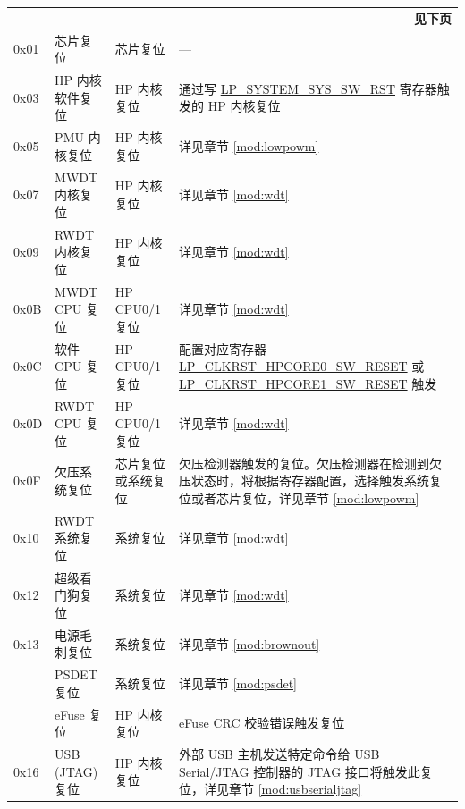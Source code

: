 \documentclass[main\_\_CN.tex]{subfiles}
\begin{document}
\begin{longtable}[c]{ |l|m{3.5cm}|m{2.7cm}|m{8.7cm}| }
    \multicolumn{4}{r}{\textbf{见下页}} \\
    \endfoot
    \endlastfoot
        0x01 & 芯片复位\tnote{1} & 芯片复位 & ---\\
        \hline
        0x03 & HP 内核软件复位 & HP 内核复位 & 通过写 \hyperref[fielddesc:LPSYSTEMSYSSWRST]{LP\_SYSTEM\_SYS\_SW\_RST} 寄存器触发的 HP 内核复位 \\\hline
        0x05 & PMU 内核复位 & HP 内核复位 & 详见章节 \ref{mod:lowpowm} \textit{\nameref{mod:lowpowm}} \\\hline
        0x07 & MWDT 内核复位\tnote{2} & HP 内核复位 & 详见章节 \ref{mod:wdt} \textit{\nameref{mod:wdt}} \\\hline
        0x09 & RWDT 内核复位 & HP 内核复位 & 详见章节 \ref{mod:wdt} \textit{\nameref{mod:wdt}} \\\hline
        0x0B & MWDT CPU 复位 & HP CPU0/1 复位 & 详见章节 \ref{mod:wdt} \textit{\nameref{mod:wdt}} \\
        \hline
        0x0C & 软件 CPU 复位 & HP CPU0/1 复位 & 配置对应寄存器 \hyperref[fielddesc:LPCLKRSTHPCORE0SWRESET]{LP\_CLKRST\_HPCORE0\_SW\_RESET} 或 \hyperref[fielddesc:LPCLKRSTHPCORE1SWRESET]{LP\_CLKRST\_HPCORE1\_SW\_RESET} 触发\\
        \hline
        0x0D & RWDT CPU 复位 & HP CPU0/1 复位 & 详见章节 \ref{mod:wdt} \textit{\nameref{mod:wdt}}  \\
        \hline
        0x0F & 欠压系统复位 & 芯片复位或系统复位 & 欠压检测器触发的复位。欠压检测器在检测到欠压状态时，将根据寄存器配置，选择触发系统复位或者芯片复位，详见章节 \ref{mod:lowpowm} \textit{\nameref{mod:lowpowm}}\\
        \hline
        0x10 & RWDT 系统复位 & 系统复位 & 详见章节 \ref{mod:wdt} \textit{\nameref{mod:wdt}}
        \\\hline
        0x12 & 超级看门狗复位 & 系统复位 & 详见章节 \ref{mod:wdt} \textit{\nameref{mod:wdt}}
        \\\hline
        0x13 & 电源毛刺复位 & 系统复位 & 详见章节 \ref{mod:brownout} \textit{\nameref{mod:brownout}}
        \\\hline
        \tagged{ESP32-P4-latest}{0x1B & PSDET 复位 & 系统复位 & 详见章节 \ref{mod:psdet} \textit{\nameref{mod:psdet}} \\
        \hline}
        0x14 & eFuse 复位 & HP 内核复位 & eFuse CRC 校验错误触发复位
        \\\hline
        0x16 & USB (JTAG) 复位 & HP 内核复位 & 外部 USB 主机发送特定命令给 USB Serial/JTAG 控制器的 JTAG 接口将触发此复位，详见章节 \ref{mod:usbserialjtag} \textit{\nameref{mod:usbserialjtag}} \\\hline

\end{longtable}
\end{document}
